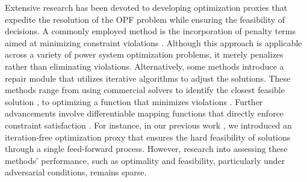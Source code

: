 

Extensive research has been devoted to developing optimization proxies that expedite the resolution of the OPF problem while ensuring the feasibility of decisions. A commonly employed method is the incorporation of penalty terms aimed at minimizing constraint violations \cite{Liu2022Pen, pan2022deepopf, liu2024teaching}. Although this approach is applicable across a variety of power system optimization problems, it merely penalizes rather than eliminating violations. Alternatively, some methods introduce a repair module that utilizes iterative algorithms to adjust the solutions. These methods range from using commercial solvers to identify the closest feasible solution \cite{zhao2020deepopf}, to optimizing a function that minimizes violations \cite{donti2021dc3}.  Further advancements involve differentiable mapping functions that directly enforce constraint satisfaction \cite{ Li_2023, chen2023end}. For instance, in our previous work \cite{li2023learning}, we introduced an iteration-free optimization proxy that ensures the hard feasibility of solutions through a single feed-forward process. However, research into assessing these methods' performance, such as optimality and feasibility, particularly under adversarial conditions, remains sparse.



